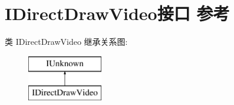 \hypertarget{interface_i_direct_draw_video}{}\section{I\+Direct\+Draw\+Video接口 参考}
\label{interface_i_direct_draw_video}
类 I\+Direct\+Draw\+Video 继承关系图\+:\begin{figure}[H]
\begin{center}
\leavevmode
\includegraphics[height=2.000000cm]{interface_i_direct_draw_video}
\end{center}
\end{figure}
